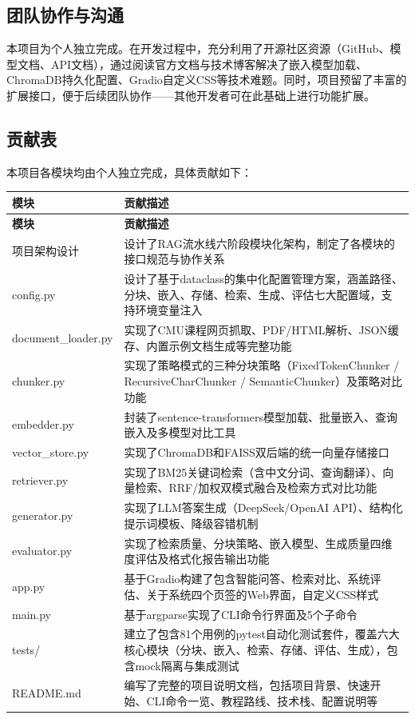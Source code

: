 \documentclass[10pt,a4paper]{article}
\begin{document}
\subsection{团队协作与沟通}

本项目为个人独立完成。在开发过程中，充分利用了开源社区资源（GitHub、模型文档、API文档），通过阅读官方文档与技术博客解决了嵌入模型加载、ChromaDB持久化配置、Gradio自定义CSS等技术难题。同时，项目预留了丰富的扩展接口，便于后续团队协作——其他开发者可在此基础上进行功能扩展。

\subsection{贡献表}

本项目各模块均由个人独立完成，具体贡献如下：

\vspace{6pt}

\begin{longtable}{@{}|p{3.5cm}|p{12cm}|@{}}
\toprule
\textbf{模块} & \textbf{贡献描述} \\
\midrule
\endfirsthead
\toprule
\textbf{模块} & \textbf{贡献描述} \\
\midrule
\endhead
\bottomrule
\endfoot
\bottomrule
\endlastfoot
项目架构设计 & 设计了RAG流水线六阶段模块化架构，制定了各模块的接口规范与协作关系 \\
config.py & 设计了基于dataclass的集中化配置管理方案，涵盖路径、分块、嵌入、存储、检索、生成、评估七大配置域，支持环境变量注入 \\
document\_loader.py & 实现了CMU课程网页抓取、PDF/HTML解析、JSON缓存、内置示例文档生成等完整功能 \\
chunker.py & 实现了策略模式的三种分块策略（FixedTokenChunker / RecursiveCharChunker / SemanticChunker）及策略对比功能 \\
embedder.py & 封装了sentence-transformers模型加载、批量嵌入、查询嵌入及多模型对比工具 \\
vector\_store.py & 实现了ChromaDB和FAISS双后端的统一向量存储接口 \\
retriever.py & 实现了BM25关键词检索（含中文分词、查询翻译）、向量检索、RRF/加权双模式融合及检索方式对比功能 \\
generator.py & 实现了LLM答案生成（DeepSeek/OpenAI API）、结构化提示词模板、降级容错机制 \\
evaluator.py & 实现了检索质量、分块策略、嵌入模型、生成质量四维度评估及格式化报告输出功能 \\
app.py & 基于Gradio构建了包含智能问答、检索对比、系统评估、关于系统四个页签的Web界面，自定义CSS样式 \\
main.py & 基于argparse实现了CLI命令行界面及5个子命令 \\
tests/ & 建立了包含81个用例的pytest自动化测试套件，覆盖六大核心模块（分块、嵌入、检索、存储、评估、生成），包含mock隔离与集成测试 \\
README.md & 编写了完整的项目说明文档，包括项目背景、快速开始、CLI命令一览、教程路线、技术栈、配置说明等 \\
\end{longtable}
\end{document}
